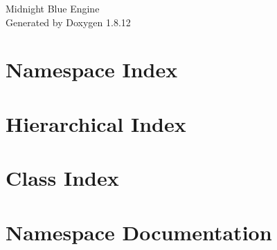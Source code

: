 \documentclass[twoside]{book}
\newcommand{\+}{\discretionary{\mbox{\scriptsize$\hookleftarrow$}}{}{}}
\newcommand{\clearemptydoublepage}{%
  \newpage{\pagestyle{empty}\cleardoublepage}%
}
\begin{document}
\hypersetup{pageanchor=false,
             bookmarksnumbered=true,
             pdfencoding=unicode
            }
\begin{titlepage}
\vspace*{7cm}
\begin{center}%
{\Large Midnight Blue Engine }\\
\vspace*{1cm}
{\large Generated by Doxygen 1.8.12}\\
\end{center}
\end{titlepage}
\clearemptydoublepage
{}
\tableofcontents
\clearemptydoublepage
{}
\hypersetup{pageanchor=true}

\chapter{Namespace Index}

\chapter{Hierarchical Index}

\chapter{Class Index}

\chapter{Namespace Documentation}













\end{document}
